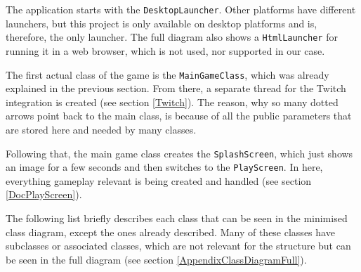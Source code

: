 \documentclass[12p]{article}
\begin{document}
The application starts with the \texttt{DesktopLauncher}. Other platforms have different launchers, but this project is only available on desktop platforms and is, therefore, the only launcher. The full diagram also shows a \texttt{HtmlLauncher} for running it in a web browser, which is not used, nor supported in our case.

The first actual class of the game is the \texttt{MainGameClass}, which was already explained in the previous section. From there, a separate thread for the Twitch integration is created (see section \ref{Twitch}). The reason, why so many dotted arrows point back to the main class, is because of all the public parameters that are stored here and needed by many classes.

Following that, the main game class creates the \texttt{SplashScreen}, which just shows an image for a few seconds and then switches to the \texttt{PlayScreen}. In here, everything gameplay relevant is being created and handled (see section \ref{DocPlayScreen}). 

The following list briefly describes each class that can be seen in the minimised class diagram, except the ones already described. Many of these classes have subclasses or associated classes, which are not relevant for the structure but can be seen in the full diagram (see section \ref{AppendixClassDiagramFull}).
\end{document}
